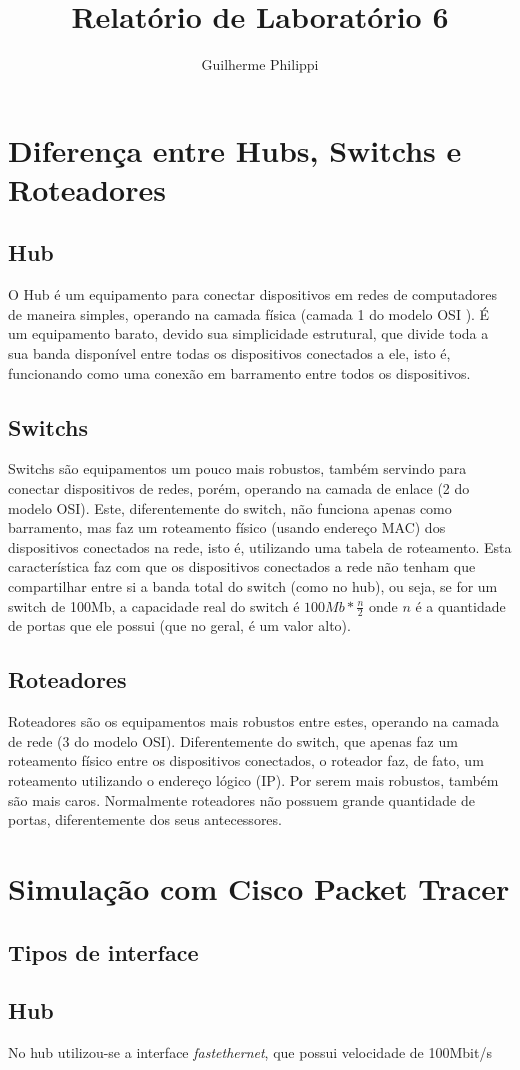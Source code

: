 \documentclass[a4paper,12pt]{article}
\title{Relatório de Laboratório 6}
\author{Guilherme Philippi}
\begin{document}
\maketitle

\section{Diferença entre Hubs, Switchs e Roteadores}

\subsection{Hub}
O Hub é um equipamento para conectar dispositivos em redes de computadores de maneira simples, operando na camada física (camada 1 do modelo OSI \cite{dean2012network}). É um equipamento barato, devido sua simplicidade estrutural, que divide toda a sua banda disponível entre todas os dispositivos conectados a ele, isto é, funcionando como uma conexão em barramento entre todos os dispositivos.
\subsection{Switchs}
Switchs são equipamentos um pouco mais robustos, também servindo para conectar dispositivos de redes, porém, operando na camada de enlace (2 do modelo OSI). Este, diferentemente do switch, não funciona apenas como barramento, mas faz um roteamento físico (usando endereço MAC) dos dispositivos conectados na rede, isto é, utilizando uma tabela de roteamento. Esta característica faz com que os dispositivos conectados a rede não tenham que compartilhar entre si a banda total do switch (como no hub), ou seja, se for um switch de 100Mb, a capacidade real do switch é $100Mb * \frac{n}{2}$ onde $n$ é a quantidade de portas que ele possui (que no geral, é um valor alto).
\subsection{Roteadores}
Roteadores são os equipamentos mais robustos entre estes, operando na camada de rede (3 do modelo OSI). Diferentemente do switch, que apenas faz um roteamento físico entre os dispositivos conectados, o roteador faz, de fato, um roteamento utilizando o endereço lógico (IP). Por serem mais robustos, também são mais caros. Normalmente roteadores não possuem grande quantidade de portas, diferentemente dos seus antecessores.

\section{Simulação com Cisco Packet Tracer}

\subsection{Tipos de interface}
\subsection{Hub}
No hub utilizou-se a interface \textit{fastethernet}, que possui velocidade de 100Mbit/s


\newpage
{}
{}



\end{document}
